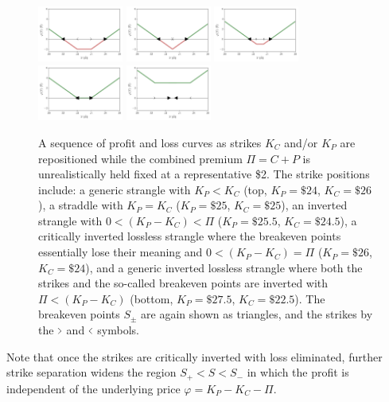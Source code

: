 \documentclass[aps,reprint]{revtex4-2}
\begin{document}
\begin{figure}[htb]
    \centering
    \includegraphics[width=0.25\textwidth]{figs/sequence1.pdf}
    \includegraphics[width=0.25\textwidth]{figs/sequence2.pdf}
    \includegraphics[width=0.25\textwidth]{figs/sequence3.pdf}
    \includegraphics[width=0.25\textwidth]{figs/sequence4.pdf}
    \includegraphics[width=0.25\textwidth]{figs/sequence5.pdf}
\caption{
    A sequence of profit and loss curves as strikes $K_C$ and/or $K_P$ are repositioned while the combined premium $\Pi = C+P$ is unrealistically held fixed at a representative \$2. The strike positions include:
    a generic strangle with $K_P < K_C$ (top, $K_P=\$24$, $K_C=\$26$),
    a straddle with $K_P = K_C$ ($K_P=\$25$, $K_C=\$25$),
    an inverted strangle with $0 < (K_P - K_C) < \Pi$ ($K_P=\$25.5$, $K_C=\$24.5$),
    a critically inverted lossless strangle where the breakeven points essentially lose their meaning and $0 < (K_P - K_C) = \Pi$ ($K_P=\$26$, $K_C=\$24$),
    and a generic inverted lossless strangle where both the strikes and the so-called breakeven points are inverted with $\Pi < (K_P - K_C)$ (bottom, $K_P=\$27.5$, $K_C=\$22.5$). 
    The breakeven points $S_\pm$ are again shown as triangles, and the strikes by the $ \scalebox{0.5}[1]{$>$} $ and $\scalebox{0.5}[1]{$<$}$ symbols.
}
    \label{fig:sequence}
\end{figure}
Note that once the strikes are critically inverted with loss eliminated, further strike separation widens the region $S_+ < S < S_-$ in which the profit is independent of the underlying price $\varphi = K_P - K_C - \Pi$.
\end{document}
